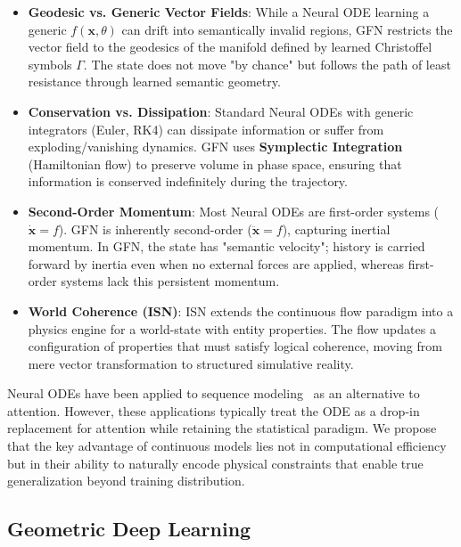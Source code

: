 \documentclass[12pt,a4paper]{article}
\begin{document}
\begin{itemize}
    \item \textbf{Geodesic vs. Generic Vector Fields}: While a Neural ODE learning a generic $f(\mathbf{x}, \theta)$ can drift into semantically invalid regions, GFN restricts the vector field to the geodesics of the manifold defined by learned Christoffel symbols $\Gamma$. The state does not move "by chance" but follows the path of least resistance through learned semantic geometry.
    
    \item \textbf{Conservation vs. Dissipation}: Standard Neural ODEs with generic integrators (Euler, RK4) can dissipate information or suffer from exploding/vanishing dynamics. GFN uses \textbf{Symplectic Integration} (Hamiltonian flow) to preserve volume in phase space, ensuring that information is conserved indefinitely during the trajectory.
    
    \item \textbf{Second-Order Momentum}: Most Neural ODEs are first-order systems ($\dot{\mathbf{x}} = f$). GFN is inherently second-order ($\ddot{\mathbf{x}} = f$), capturing inertial momentum. In GFN, the state has "semantic velocity"; history is carried forward by inertia even when no external forces are applied, whereas first-order systems lack this persistent momentum.
    
    \item \textbf{World Coherence (ISN)}: ISN extends the continuous flow paradigm into a physics engine for a world-state with entity properties. The flow updates a configuration of properties that must satisfy logical coherence, moving from mere vector transformation to structured simulative reality.
\end{itemize}

Neural ODEs have been applied to sequence modeling~\cite{rubanova2019} as an alternative to attention. However, these applications typically treat the ODE as a drop-in replacement for attention while retaining the statistical paradigm. We propose that the key advantage of continuous models lies not in computational efficiency but in their ability to naturally encode physical constraints that enable true generalization beyond training distribution.

\subsection{Geometric Deep Learning}
\label{sec:geometric-dl}
\end{document}

